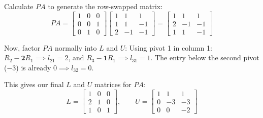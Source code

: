 \documentclass[../linear-algebra.tex]{subfiles}
\begin{document}
\noindent Calculate $PA$ to generate the row-swapped matrix:
\[
PA = \begin{bmatrix} 1 & 0 & 0 \\ 0 & 0 & 1 \\ 0 & 1 & 0 \end{bmatrix} \begin{bmatrix} 1 & 1 & 1 \\ 1 & 1 & -1 \\ 2 & -1 & -1 \end{bmatrix} 
= \begin{bmatrix} 1 & 1 & 1 \\ 2 & -1 & -1 \\ 1 & 1 & -1 \end{bmatrix}
\]

\noindent Now, factor $PA$ normally into $L$ and $U$:
Using pivot 1 in column 1: $R_2 - \mathbf{2}R_1 \implies l_{21} = 2$, and $R_3 - \mathbf{1}R_1 \implies l_{31} = 1$.
The entry below the second pivot ($-3$) is already $0 \implies l_{32} = 0$.

\noindent This gives our final $L$ and $U$ matrices for $PA$:
\[
L = \begin{bmatrix} 1 & 0 & 0 \\ 2 & 1 & 0 \\ 1 & 0 & 1 \end{bmatrix}, \qquad
U = \begin{bmatrix} 1 & 1 & 1 \\ 0 & -3 & -3 \\ 0 & 0 & -2 \end{bmatrix}
\]
\end{document}
